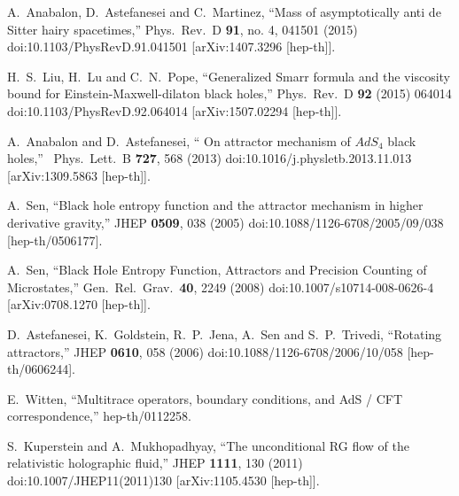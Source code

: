 \documentclass[11pt,epsf,letterpaper]{article}%
\begin{document}
\begin{thebibliography}{99}
A.~Anabalon, D.~Astefanesei and C.~Martinez, ``Mass
of asymptotically anti de Sitter hairy spacetimes,'' Phys.\ Rev.\ D
\textbf{91}, no. 4, 041501 (2015) doi:10.1103/PhysRevD.91.041501
[arXiv:1407.3296 [hep-th]].


H.~S.~Liu, H.~Lu and C.~N.~Pope, ``Generalized Smarr
formula and the viscosity bound for Einstein-Maxwell-dilaton black holes,''
Phys.\ Rev.\ D \textbf{92} (2015) 064014 doi:10.1103/PhysRevD.92.064014
[arXiv:1507.02294 [hep-th]].

A.~Anabalon and D.~Astefanesei, \textquotedblleft
On attractor mechanism of $AdS_{4}$ black holes,\textquotedblright%
\ Phys.\ Lett.\ B \textbf{727}, 568 (2013) doi:10.1016/j.physletb.2013.11.013
[arXiv:1309.5863 [hep-th]].




A.~Sen, ``Black hole entropy function and the attractor
mechanism in higher derivative gravity,'' JHEP \textbf{0509}, 038 (2005)
doi:10.1088/1126-6708/2005/09/038 [hep-th/0506177].




A.~Sen, ``Black Hole Entropy Function, Attractors and
Precision Counting of Microstates,'' Gen.\ Rel.\ Grav.\ \textbf{40}, 2249
(2008) doi:10.1007/s10714-008-0626-4 [arXiv:0708.1270 [hep-th]].




D.~Astefanesei, K.~Goldstein, R.~P.~Jena, A.~Sen
and S.~P.~Trivedi, ``Rotating attractors,'' JHEP \textbf{0610}, 058 (2006)
doi:10.1088/1126-6708/2006/10/058 [hep-th/0606244].


E.~Witten, ``Multitrace operators, boundary
conditions, and AdS / CFT correspondence,'' hep-th/0112258.


S.~Kuperstein and A.~Mukhopadhyay, ``The
unconditional RG flow of the relativistic holographic fluid,'' JHEP
\textbf{1111}, 130 (2011) doi:10.1007/JHEP11(2011)130 [arXiv:1105.4530
[hep-th]].



\end{thebibliography}
\end{document}
